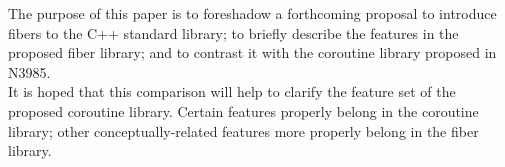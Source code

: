 The purpose of this paper is to foreshadow a forthcoming proposal to introduce
fibers to the C++ standard library; to briefly describe the features in the
proposed fiber library; and to contrast it with the coroutine library proposed
in N3985\cite{n3985}.\\
\newline
It is hoped that this comparison will help to clarify the feature set of the
proposed coroutine library. Certain features properly belong in the coroutine
library; other conceptually-related features more properly belong in the fiber
library.
